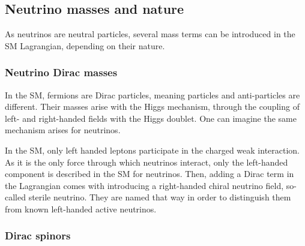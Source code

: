 \subsection{Neutrino masses and nature}


As neutrinos are neutral particles, several mass terms can be introduced in the SM Lagrangian, depending on their nature.

\subsubsection{Neutrino Dirac masses}
\label{subsec:dirac_mass}

In the SM, fermions are Dirac particles, meaning particles and anti-particles are different.
Their masses arise with the Higgs mechanism, through the coupling of left- and right-handed fields with the Higgs doublet.
One can imagine the same mechanism arises for neutrinos.

In the SM, only left handed leptons participate in the charged weak interaction.
As it is the only force through which neutrinos interact, only the left-handed component is described in the SM for neutrinos.
Then, adding a Dirac term in the Lagrangian comes with introducing a right-handed chiral neutrino field, so-called sterile neutrino.
They are named that way in order to distinguish them from known left-handed active neutrinos.

\subsubsection*{Dirac spinors}

